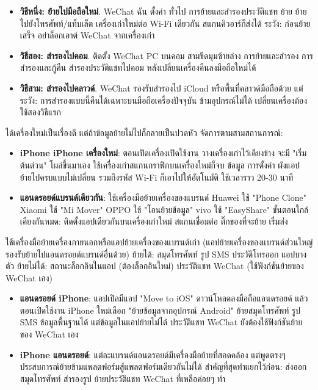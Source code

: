 \begin{itemize}
  \item \textbf{วิธีหนึ่ง: ย้ายไปมือถือใหม่}. WeChat ฉัน ตั้งค่า ทั่วไป การย้ายและสำรองประวัติแชท ย้าย ย้ายไปยังโทรศัพท์/แท็บเล็ต เครื่องเก่าใหม่ต่อ Wi-Fi เดียวกัน สแกนคิวอาร์ก็ส่งได้ ระวัง: ก่อนย้ายเสร็จ อย่าล็อกเอาต์ WeChat จากเครื่องเก่า
  \item \textbf{วิธีสอง: สำรองไปคอม}. ติดตั้ง WeChat PC บนคอม สามขีดมุมซ้ายล่าง การย้ายและสำรอง การสำรองและกู้คืน สำรองประวัติแชทไปคอม หลังเปลี่ยนเครื่องคืนลงมือถือใหม่ได้
  \item \textbf{วิธีสาม: สำรองไปคลาวด์}. WeChat รองรับสำรองไป iCloud หรือพื้นที่คลาวด์มือถือด้วย แต่ระวัง: การสำรองแบบนี้คืนได้เฉพาะบนมือถือเครื่องปัจจุบัน ข้ามอุปกรณ์ไม่ได้ เปลี่ยนเครื่องต้องใช้สองวิธีแรก
\end{itemize}


ได้เครื่องใหม่เป็นเรื่องดี แต่ถ้าข้อมูลย้ายไม่ไปก็กลายเป็นปวดหัว จัดการตามสามสถานการณ์:


\begin{itemize}
  \item \textbf{iPhone iPhone เครื่องใหม่}: ตอนเปิดเครื่องเปิดใช้งาน วางเครื่องเก่าไว้เคียงข้าง จะมี "เริ่มต้นด่วน" โผล่ขึ้นมาเอง ใช้เครื่องเก่าสแกนกราฟิกบนเครื่องใหม่ก็จบ ข้อมูล การตั้งค่า ผังแอป ย้ายไปครบแบบไม่เปลี่ยน รวมถึงรหัส Wi-Fi ก็เอาไปให้อัตโนมัติ ใช้เวลาราว 20-30 นาที
  \item \textbf{แอนดรอยด์แบรนด์เดียวกัน}: ใช้เครื่องมือย้ายเครื่องของแบรนด์ Huawei ใช้ "Phone Clone" Xiaomi ใช้ "Mi Mover" OPPO ใช้ "โอนย้ายข้อมูล" vivo ใช้ "EasyShare" ขั้นตอนใกล้เคียงกันหมด: ติดตั้งแอปเดียวกันบนเครื่องเก่าใหม่ สแกนเชื่อมต่อ ติ๊กของที่จะย้าย เริ่มส่ง
\end{itemize}


ใช้เครื่องมือย้ายเครื่องภายนอกหรือแอปย้ายเครื่องของแบรนด์เก่า (แอปย้ายเครื่องของแบรนด์ส่วนใหญ่รองรับย้ายไปแอนดรอยด์แบรนด์อื่นด้วย) ย้ายได้: สมุดโทรศัพท์ รูป SMS ประวัติโทรออก แอปบางตัว ย้ายไม่ได้: สถานะล็อกอินในแอป (ต้องล็อกอินใหม่) ประวัติแชท WeChat (ใช้ฟังก์ชันย้ายของ WeChat เอง)


\begin{itemize}
  \item \textbf{แอนดรอยด์ iPhone}: แอปเปิลมีแอป "Move to iOS" ดาวน์โหลดลงมือถือแอนดรอยด์ แล้วตอนเปิดใช้งาน iPhone ใหม่เลือก "ย้ายข้อมูลจากอุปกรณ์ Android" ย้ายสมุดโทรศัพท์ รูป SMS ข้อมูลพื้นฐานได้ แต่ข้อมูลในแอปย้ายไม่ได้ ประวัติแชท WeChat ยังต้องใช้ฟังก์ชันย้ายของ WeChat เอง
  \item \textbf{iPhone แอนดรอยด์}: แต่ละแบรนด์แอนดรอยด์มีเครื่องมือย้ายที่สอดคล้อง แต่พูดตรงๆ ประสบการณ์ย้ายข้ามแพลตฟอร์มสู้แพลตฟอร์มเดียวกันไม่ได้ สำคัญที่สุดทำแยกไว้ก่อน: ส่งออกสมุดโทรศัพท์ สำรองรูป ย้ายประวัติแชท WeChat ที่เหลือค่อยๆ ทำ
\end{itemize}

